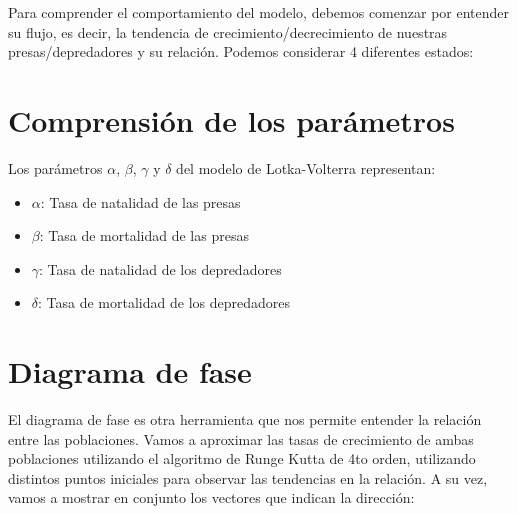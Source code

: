 \documentclass{article}
\begin{document}
Para comprender el comportamiento del modelo, debemos comenzar por entender su flujo, es decir, la tendencia de crecimiento/decrecimiento de nuestras presas/depredadores y su relación.
Podemos considerar 4 diferentes estados:

\begin{center}
\end{center}

\section{Comprensión de los parámetros}

Los parámetros $\alpha$, $\beta$, $\gamma$ y $\delta$ del modelo de Lotka-Volterra representan:

\begin{itemize}
    \item{$\alpha$: Tasa de natalidad de las presas}
    \item{$\beta$: Tasa de mortalidad de las presas}
    \item{$\gamma$: Tasa de natalidad de los depredadores}
    \item{$\delta$: Tasa de mortalidad de los depredadores}
\end{itemize}

\pagebreak
\section{Diagrama de fase}

El diagrama de fase es otra herramienta que nos permite entender la relación entre las poblaciones. Vamos a aproximar las tasas de crecimiento de ambas poblaciones utilizando el algoritmo de Runge Kutta de 4to orden, utilizando distintos puntos iniciales para observar las tendencias en la relación. A su vez, vamos a mostrar en conjunto los vectores que indican la dirección:
\end{document}
